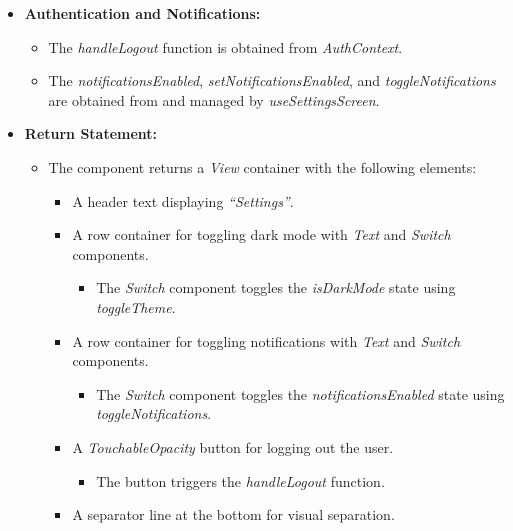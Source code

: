 \begin{itemize}
    \item \textbf{Authentication and Notifications:}
    \begin{itemize}
        \item The \textit{handleLogout} function is obtained from \textit{AuthContext}.
        \item The \textit{notificationsEnabled}, \textit{setNotificationsEnabled}, and \textit{toggleNotifications} are obtained from and managed by \textit{useSettingsScreen}.
    \end{itemize}

    \item \textbf{Return Statement:}
    \begin{itemize}
        \item The component returns a \textit{View} container with the following elements:
        \begin{itemize}
            \item A header text displaying \textit{``Settings''}.
            \item A row container for toggling dark mode with \textit{Text} and \textit{Switch} components.
            \begin{itemize}
                \item The \textit{Switch} component toggles the \textit{isDarkMode} state using \textit{toggleTheme}.
            \end{itemize}
            \item A row container for toggling notifications with \textit{Text} and \textit{Switch} components.
            \begin{itemize}
                \item The \textit{Switch} component toggles the \textit{notificationsEnabled} state using \textit{toggleNotifications}.
            \end{itemize}
            \item A \textit{TouchableOpacity} button for logging out the user.
            \begin{itemize}
                \item The button triggers the \textit{handleLogout} function.
            \end{itemize}
            \item A separator line at the bottom for visual separation.
        \end{itemize}
    \end{itemize}
\end{itemize}

